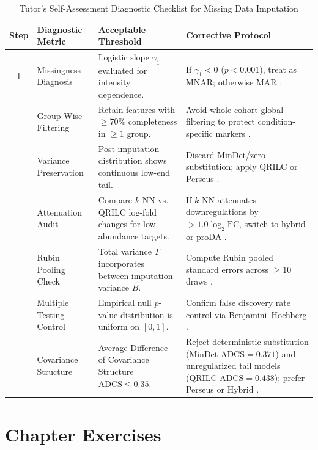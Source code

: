 \documentclass[11pt,oneside]{book}
\begin{document}
\begin{table}[htbp]
\centering
\caption{Tutor's Self-Assessment Diagnostic Checklist for Missing Data Imputation}
\label{tab:missing_checklist}
\small
\begin{tabularx}{\textwidth}{c p{3.6cm} p{4.2cm} X}
\toprule
\textbf{Step} & \textbf{Diagnostic Metric} & \textbf{Acceptable Threshold} & \textbf{Corrective Protocol} \\
\midrule
1 & Missingness Diagnosis & Logistic slope $\gamma_1$ evaluated for intensity dependence. & If $\gamma_1 < 0$ ($p < 0.001$), treat as MNAR; otherwise MAR \cite{ahlmann2020proda}. \\
\addlinespace
2 & Group-Wise Filtering & Retain features with $\ge 70\%$ completeness in $\ge 1$ group. & Avoid whole-cohort global filtering to protect condition-specific markers \cite{zhang2018dep}. \\
\addlinespace
3 & Variance Preservation & Post-imputation distribution shows continuous low-end tail. & Discard MinDet/zero substitution; apply QRILC or Perseus \cite{lazar2016accounting}. \\
\addlinespace
4 & Attenuation Audit & Compare $k$-NN vs. QRILC log-fold changes for low-abundance targets. & If $k$-NN attenuates downregulations by $> 1.0 \log_2\text{FC}$, switch to hybrid or proDA \cite{palstrom2020imputation}. \\
\addlinespace
5 & Rubin Pooling Check & Total variance $T$ incorporates between-imputation variance $B$. & Compute Rubin pooled standard errors across $\ge 10$ draws \cite{rubin1987multiple, barnard1999small}. \\
\addlinespace
6 & Multiple Testing Control & Empirical null $p$-value distribution is uniform on $[0, 1]$. & Confirm false discovery rate control via Benjamini--Hochberg \cite{benjamini1995controlling}. \\
\addlinespace
7 & Covariance Structure & Average Difference of Covariance Structure $\text{ADCS} \le 0.35$. & Reject deterministic substitution (MinDet $\text{ADCS}=0.371$) and unregularized tail models (QRILC $\text{ADCS}=0.438$); prefer Perseus or Hybrid \cite{templ2023visualization}. \\
\bottomrule
\end{tabularx}
\end{table}

\section{Chapter Exercises}
\end{document}
